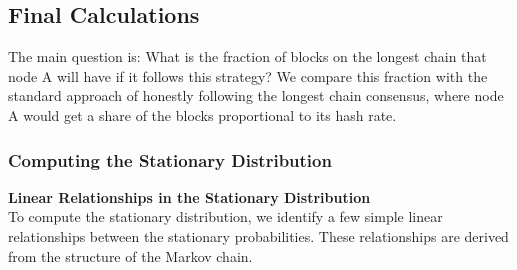 \subsection{Final Calculations}
The main question is: What is the fraction of blocks on the longest chain that node A will have if it follows this strategy? We compare this fraction with the standard approach of honestly following the longest chain consensus, where node A would get a share of the blocks proportional to its hash rate.

\subsubsection{Computing the Stationary Distribution}
\textbf{Linear Relationships in the Stationary Distribution}\\
To compute the stationary distribution, we identify a few simple linear relationships between the stationary probabilities. These relationships are derived from the structure of the Markov chain.
